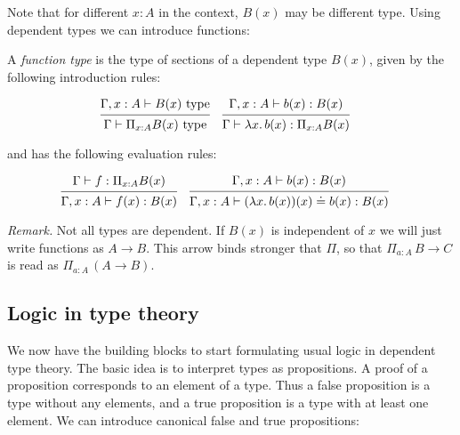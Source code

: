 \documentclass[a4paper, 12pt]{article}
\newcommand{\la}[1]{\lambda{#1}.\,}
\theoremstyle{changedot}
\theoremstyle{changedotbreak}
\theoremstyle{nonumberplain}
\begin{document}
Note that for different $x : A$ in the context, $B(x)$ may be different type. Using dependent types we can introduce functions:

\begin{definition}
  A \textit{function type} is the type of sections of a dependent type $B(x)$, given by the following introduction rules:

  \begin{align*}
    &\begin{prooftree}
      \hypo{\Gamma, x : A \vdash B(x) \text{ type}}
      \infer1{\Gamma \vdash \Pi_{x:A} B(x) \text{ type}}
    \end{prooftree}
      &
    &\begin{prooftree}
      \hypo{\Gamma, x : A \vdash b(x) : B(x)}
      \infer1{\Gamma \vdash \la x b(x) : \Pi_{x:A} B(x)}
    \end{prooftree}
  \end{align*}

  and has the following evaluation rules:

  \begin{align*}
    &\begin{prooftree}
      \hypo{\Gamma \vdash f : \Pi_{x:A} B(x)}
      \infer1{\Gamma, x : A \vdash f(x) : B(x)}
    \end{prooftree}
    &
    &\begin{prooftree}
      \hypo{\Gamma, x : A \vdash b(x) : B(x)}
      \infer1{\Gamma, x : A \vdash (\la x b(x))(x) \doteq b(x) : B(x)}
    \end{prooftree}
  \end{align*}

\end{definition}

\textit{Remark.} Not all types are dependent. If $B(x)$ is independent of $x$ we will just write functions as $A \to B$. This arrow binds stronger that $\Pi$, so that $\Pi_{a:A}\, B \to C$ is read as $\Pi_{a:A}\, (A \to B)$.

\subsection{Logic in type theory}
We now have the building blocks to start formulating usual logic in dependent type theory. The basic idea is to interpret types as propositions. A proof of a proposition corresponds to an element of a type. Thus a false proposition is a type without any elements, and a true proposition is a type with at least one element. We can introduce canonical false and true propositions:
\end{document}
